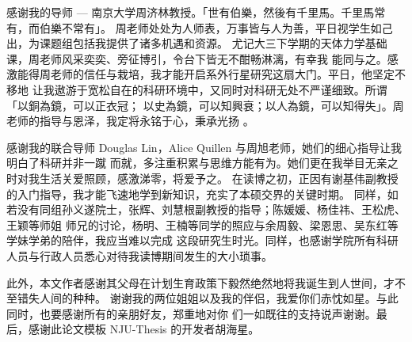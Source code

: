 \begin{acknowledgement}

感谢我的导师 --- 南京大学周济林教授。「世有伯樂，然後有千里馬。千里馬常有，而伯樂不常有」。
周老师处处为人师表，万事皆与人为善，平日视学生如己出，为课题组包括我提供了诸多机遇和资源。
尤记大三下学期的天体力学基础课，周老师风采奕奕、旁征博引，令台下皆无不酣畅淋漓，有幸我
能同与之。感激能得周老师的信任与栽培，我才能开启系外行星研究这扇大门。平日，他坚定不移地
让我遨游于宽松自在的科研环境中，又同时对科研无处不严谨细致。所谓「以銅為鏡，可以正衣冠；
以史為鏡，可以知興衰；以人為鏡，可以知得失」。周老师的指导与恩泽，我定将永铭于心，秉承光扬 。

\vspace{1em}

感谢我的联合导师 Douglas Lin，Alice Quillen 与周旭老师，她们的细心指导让我明白了科研并非一蹴
而就，多注重积累与思维方能有为。她们更在我举目无亲之时对我生活关爱照顾，感激涕零，将爱予之。
在读博之初，正因有谢基伟副教授的入门指导，我才能飞速地学到新知识，充实了本硕交界的关键时期。
同样，如若没有同组孙义遂院士，张辉、刘慧根副教授的指导；陈媛媛、杨佳祎、王松虎、王颖等师姐
师兄的讨论，杨明、王楠等同学的照应与余周毅、梁恩思、吴东红等学妹学弟的陪伴，我应当难以完成
这段研究生时光。同样，也感谢学院所有科研人员与行政人员悉心对待我读博期间发生的大小琐事。

\vspace{1em}

此外，本文作者感谢其父母在计划生育政策下毅然绝然地将我诞生到人世间，才不至错失人间的种种。
谢谢我的两位姐姐以及我的伴侣，我爱你们赤忱如星。与此同时，也要感谢所有的亲朋好友，郑重地对你
们一如既往的支持说声谢谢。最后，感谢此论文模板 NJU-Thesis 的开发者胡海星。


\end{acknowledgement}
